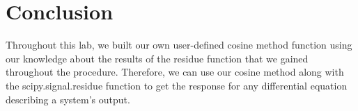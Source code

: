 \documentclass[12pt]{report}
\begin{document}
\section{Conclusion}
Throughout this lab, we built our own user-defined cosine method function using our knowledge about the results of the residue function that we gained throughout the procedure. Therefore, we can use our cosine method along with the scipy.signal.residue function to get the response for any differential equation describing a system's output.
\end{document}
